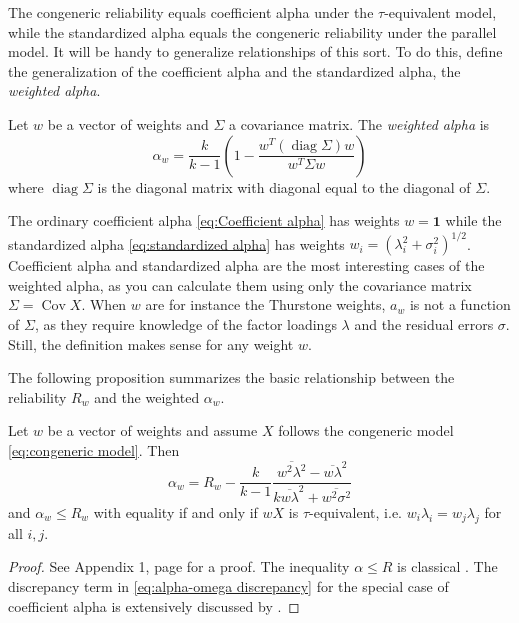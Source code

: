 \documentclass[twoside]{article}
\DeclareMathOperator{\Cov}{Cov}
\DeclareMathOperator{\diag}{diag}
\renewcommand{\sqrt}[1]{{(#1)^{1/2}}}
\begin{document}
The congeneric reliability equals coefficient alpha under the $\tau$-equivalent model, while the standardized alpha equals the congeneric reliability under the parallel model. It will be handy to generalize relationships of this sort. To do this, define the generalization of the coefficient alpha and the standardized alpha, the \textit{weighted alpha}.
\begin{defn}
Let $w$ be a vector of weights and $\Sigma$ a covariance matrix. The \textit{weighted alpha} is
\begin{equation}
\alpha_{w}=\frac{k}{k-1}\left(1-\frac{w^{T}(\diag\Sigma)w}{w^{T}\Sigma w}\right)\label{eq:weighted alpha}
\end{equation}
where $\diag\Sigma$ is the diagonal matrix with diagonal equal to the diagonal of $\Sigma$.
\end{defn}
The ordinary coefficient alpha \eqref{eq:Coefficient alpha} has weights $w=\boldsymbol{1}$
while the standardized alpha \eqref{eq:standardized alpha} has weights $w_{i}=\sqrt{\lambda_{i}^{2}+\sigma_{i}^{2}}$. Coefficient alpha and standardized alpha are the most interesting cases of the weighted alpha, as you can calculate them using only the covariance matrix $\Sigma = \Cov X$. When $w$ are for instance the Thurstone weights, $a_w$ is not a function of $\Sigma$, as they require knowledge of the factor loadings $\lambda$ and the residual errors $\sigma$. Still, the definition makes sense for any weight $w$. 

The following proposition summarizes the basic relationship
between the reliability $ R_{w}$ and the weighted $\alpha_{w}$.
\begin{prop}
\label{prop:weighted alpha}Let $w$ be a vector of weights and
assume $X$ follows the congeneric model \eqref{eq:congeneric model}. Then 
\begin{equation}
\alpha_{w}= R_{w}-\frac{k}{k-1}\frac{\overline{w^{2}\lambda^{2}}-\overline{w\lambda}^{2}}{k\overline{w\lambda}^{2}+\overline{w^{2}\sigma^{2}}}\label{eq:alpha-omega discrepancy}
\end{equation}
and $\alpha_w \leq  R_w$ with equality if and only if $wX$ is $\tau$-equivalent, i.e. $w_i\lambda_{i}=w_j\lambda_{j}$
for all $i,j$.
\end{prop}
\begin{proof}
See Appendix 1, page \pageref{proof:weighted alpha}
for a proof. The inequality $\alpha\leq R$ is classical \citep[][Theorem 4.4.3]{Lord1968-ax}. The discrepancy term in \eqref{eq:alpha-omega discrepancy} for the special case of coefficient alpha is extensively discussed by \citet{Raykov1997-bu}. 
\end{proof}
\end{document}
